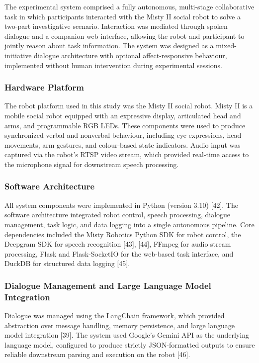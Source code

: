 \documentclass[
  letterpaper,
  DIV=11,
  numbers=noendperiod]{scrartcl}
\begin{document}
The experimental system comprised a fully autonomous, multi-stage
collaborative task in which participants interacted with the Misty II
social robot to solve a two-part investigative scenario. Interaction was
mediated through spoken dialogue and a companion web interface, allowing
the robot and participant to jointly reason about task information. The
system was designed as a mixed-initiative dialogue architecture with
optional affect-responsive behaviour, implemented without human
intervention during experimental sessions.

\subsubsection{Hardware Platform}\label{hardware-platform}

The robot platform used in this study was the Misty II social robot.
Misty II is a mobile social robot equipped with an expressive display,
articulated head and arms, and programmable RGB LEDs. These components
were used to produce synchronized verbal and nonverbal behaviour,
including eye expressions, head movements, arm gestures, and
colour-based state indicators. Audio input was captured via the robot's
RTSP video stream, which provided real-time access to the microphone
signal for downstream speech processing.

\subsubsection{Software Architecture}\label{software-architecture}

All system components were implemented in Python (version 3.10)
{[}42{]}. The software architecture integrated robot control, speech
processing, dialogue management, task logic, and data logging into a
single autonomous pipeline. Core dependencies included the Misty
Robotics Python SDK for robot control, the Deepgram SDK for speech
recognition {[}43{]}, {[}44{]}, FFmpeg for audio stream processing,
Flask and Flask-SocketIO for the web-based task interface, and DuckDB
for structured data logging {[}45{]}.

\subsubsection{Dialogue Management and Large Language Model
Integration}\label{dialogue-management-and-large-language-model-integration}

Dialogue was managed using the LangChain framework, which provided
abstraction over message handling, memory persistence, and large
language model integration {[}39{]}. The system used Google's Gemini API
as the underlying language model, configured to produce strictly
JSON-formatted outputs to ensure reliable downstream parsing and
execution on the robot {[}46{]}.
\end{document}
